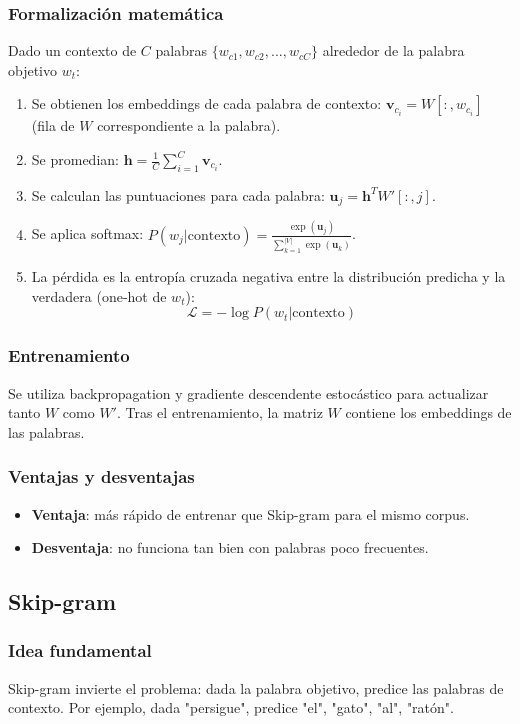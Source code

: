 \documentclass[12pt,a4paper,openany,oneside]{book}
\begin{document}
\subsubsection{Formalización matemática}
Dado un contexto de \(C\) palabras \(\{w_{c1}, w_{c2}, ..., w_{cC}\}\) alrededor de la palabra objetivo \(w_t\):

\begin{enumerate}
    \item Se obtienen los embeddings de cada palabra de contexto: \(\mathbf{v}_{c_i} = W[:, w_{c_i}]\) (fila de \(W\) correspondiente a la palabra).
    \item Se promedian: \(\mathbf{h} = \frac{1}{C} \sum_{i=1}^C \mathbf{v}_{c_i}\).
    \item Se calculan las puntuaciones para cada palabra: \(\mathbf{u}_j = \mathbf{h}^T W'[:, j]\).
    \item Se aplica softmax: \(P(w_j | \text{contexto}) = \frac{\exp(\mathbf{u}_j)}{\sum_{k=1}^{|V|} \exp(\mathbf{u}_k)}\).
    \item La pérdida es la entropía cruzada negativa entre la distribución predicha y la verdadera (one-hot de \(w_t\)):
    \[
    \mathcal{L} = -\log P(w_t | \text{contexto})
    \]
\end{enumerate}

\subsubsection{Entrenamiento}
Se utiliza backpropagation y gradiente descendente estocástico para actualizar tanto \(W\) como \(W'\). Tras el entrenamiento, la matriz \(W\) contiene los embeddings de las palabras.

\subsubsection{Ventajas y desventajas}
\begin{itemize}
    \item \textbf{Ventaja}: más rápido de entrenar que Skip-gram para el mismo corpus.
    \item \textbf{Desventaja}: no funciona tan bien con palabras poco frecuentes.
\end{itemize}

\subsection{Skip-gram}
\subsubsection{Idea fundamental}
Skip-gram invierte el problema: dada la palabra objetivo, predice las palabras de contexto. Por ejemplo, dada "persigue", predice "el", "gato", "al", "ratón".
\end{document}

